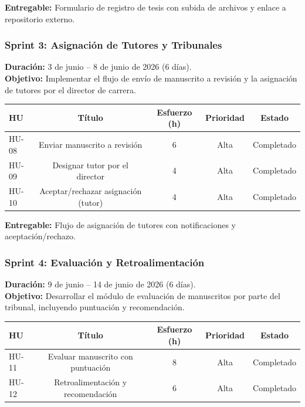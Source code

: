 \textbf{Entregable:} Formulario de registro de tesis con subida de archivos y enlace a repositorio externo.

\subsubsection{Sprint 3: Asignación de Tutores y Tribunales}
\label{sprint:3}

\textbf{Duración:} 3 de junio – 8 de junio de 2026 (6 días). \\
\textbf{Objetivo:} Implementar el flujo de envío de manuscrito a revisión y la asignación de tutores por el director de carrera.

\begin{center}
\begin{tabular}{lcccc}
\toprule
\textbf{HU} & \textbf{Título} & \textbf{Esfuerzo (h)} & \textbf{Prioridad} & \textbf{Estado} \\
\midrule
HU-08 & Enviar manuscrito a revisión & 6 & Alta & Completado \\
HU-09 & Designar tutor por el director & 4 & Alta & Completado \\
HU-10 & Aceptar/rechazar asignación (tutor) & 4 & Alta & Completado \\
\bottomrule
\end{tabular}
\end{center}

\textbf{Entregable:} Flujo de asignación de tutores con notificaciones y aceptación/rechazo.

\subsubsection{Sprint 4: Evaluación y Retroalimentación}
\label{sprint:4}

\textbf{Duración:} 9 de junio – 14 de junio de 2026 (6 días). \\
\textbf{Objetivo:} Desarrollar el módulo de evaluación de manuscritos por parte del tribunal, incluyendo puntuación y recomendación.

\begin{center}
\begin{tabular}{lcccc}
\toprule
\textbf{HU} & \textbf{Título} & \textbf{Esfuerzo (h)} & \textbf{Prioridad} & \textbf{Estado} \\
\midrule
HU-11 & Evaluar manuscrito con puntuación & 8 & Alta & Completado \\
HU-12 & Retroalimentación y recomendación & 6 & Alta & Completado \\
\bottomrule
\end{tabular}
\end{center}

